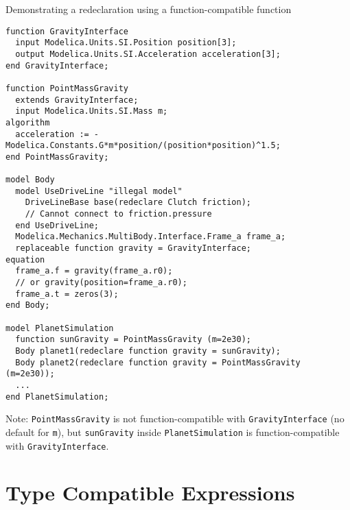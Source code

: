 \begin{example}
Demonstrating a redeclaration using a function-compatible function
\begin{lstlisting}[language=modelica]
function GravityInterface
  input Modelica.Units.SI.Position position[3];
  output Modelica.Units.SI.Acceleration acceleration[3];
end GravityInterface;

function PointMassGravity
  extends GravityInterface;
  input Modelica.Units.SI.Mass m;
algorithm
  acceleration := -Modelica.Constants.G*m*position/(position*position)^1.5;
end PointMassGravity;

model Body
  model UseDriveLine "illegal model"
    DriveLineBase base(redeclare Clutch friction);
    // Cannot connect to friction.pressure
  end UseDriveLine;
  Modelica.Mechanics.MultiBody.Interface.Frame_a frame_a;
  replaceable function gravity = GravityInterface;
equation
  frame_a.f = gravity(frame_a.r0);
  // or gravity(position=frame_a.r0);
  frame_a.t = zeros(3);
end Body;

model PlanetSimulation
  function sunGravity = PointMassGravity (m=2e30);
  Body planet1(redeclare function gravity = sunGravity);
  Body planet2(redeclare function gravity = PointMassGravity (m=2e30));
  ...
end PlanetSimulation;
\end{lstlisting}

Note: \lstinline!PointMassGravity! is not function-compatible with
\lstinline!GravityInterface! (no default for \lstinline!m!), but \lstinline!sunGravity!
inside \lstinline!PlanetSimulation! is function-compatible with
\lstinline!GravityInterface!.
\end{example}

\section{Type Compatible Expressions}\label{type-compatible-expressions}

